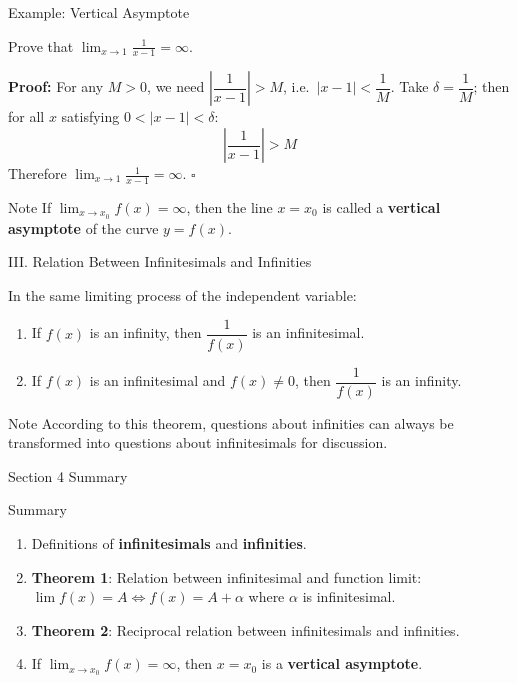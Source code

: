 \documentclass[UTF8,10pt]{beamer}
\begin{document}
\begin{frame}{Example: Vertical Asymptote}
\begin{example}
Prove that $\displaystyle \lim_{x \to 1}\frac{1}{x-1} = \infty$.
\end{example}
\pause
\textbf{Proof:} For any $M > 0$, we need $\left|\dfrac{1}{x-1}\right| > M$, i.e.\ $|x-1| < \dfrac{1}{M}$.
\pause
Take $\delta = \dfrac{1}{M}$; then for all $x$ satisfying $0 < |x-1| < \delta$:
\[
\left|\frac{1}{x-1}\right| > M
\]
\pause
Therefore $\displaystyle \lim_{x \to 1}\frac{1}{x-1} = \infty$. \hfill $\square$
\pause
\vspace{0.3em}
\begin{alertblock}{Note}
If $\displaystyle \lim_{x \to x_0} f(x) = \infty$, then the line $x = x_0$ is called a
\textbf{vertical asymptote} of the curve $y = f(x)$.
\end{alertblock}
\end{frame}

\begin{frame}{III. Relation Between Infinitesimals and Infinities}
\begin{theorem}
In the same limiting process of the independent variable:
\begin{enumerate}
    \item If $f(x)$ is an infinity, then $\dfrac{1}{f(x)}$ is an infinitesimal.
    \item If $f(x)$ is an infinitesimal and $f(x) \neq 0$, then $\dfrac{1}{f(x)}$ is an infinity.
\end{enumerate}
\end{theorem}
\pause
\vspace{0.5em}
\begin{block}{Note}
According to this theorem, questions about infinities can always be transformed into
questions about infinitesimals for discussion.
\end{block}
\end{frame}

\begin{frame}{Section 4 Summary}
\begin{block}{Summary}
\begin{enumerate}
    \item Definitions of \textbf{infinitesimals} and \textbf{infinities}.
    \item \textbf{Theorem 1}: Relation between infinitesimal and function limit:\\
          $\lim f(x) = A \Leftrightarrow f(x) = A + \alpha$ where $\alpha$ is infinitesimal.
    \item \textbf{Theorem 2}: Reciprocal relation between infinitesimals and infinities.
    \item If $\lim_{x\to x_0} f(x) = \infty$, then $x=x_0$ is a \textbf{vertical asymptote}.
\end{enumerate}
\end{block}
\end{frame}
\end{document}
